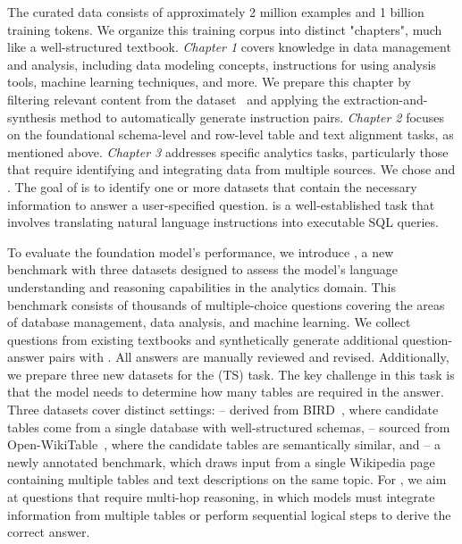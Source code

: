 The curated data consists of approximately 2 million examples and 1 billion training tokens. We organize this training corpus into distinct "chapters", much like a well-structured textbook.
\textit{Chapter 1} covers knowledge in data management and analysis, including data modeling concepts, instructions for using analysis tools, machine learning techniques, and more. We prepare this chapter by filtering relevant content from the \fineweb dataset~\citep{penedo2024fineweb} and applying the extraction-and-synthesis method to automatically generate instruction pairs.
\textit{Chapter 2} focuses on the foundational schema-level and row-level table and text alignment tasks, as mentioned above.
\textit{Chapter 3} addresses specific analytics tasks, particularly those that require identifying and integrating data from multiple sources. We chose \datadiscovery and \texttosql.
The goal of \datadiscovery is to identify one or more datasets that contain the necessary information to answer a user-specified question. \texttosql is a well-established task that involves translating natural language instructions into executable SQL queries. 

To evaluate the foundation model’s performance, we introduce \mmlu, a new benchmark with three datasets designed to assess the model's language understanding and reasoning capabilities in the analytics domain. This benchmark consists of thousands of multiple-choice questions covering the areas of database management, data analysis, and machine learning. We collect questions from existing textbooks and synthetically generate additional question-answer pairs with \claudetf. All answers are manually reviewed and revised. 
Additionally, we prepare three new datasets for the \datadiscovery (TS) task. The key challenge in this task is that the model needs to determine how many tables are required in the answer. Three datasets cover distinct settings:
\birdselect -- derived from BIRD~\citep{bird}, where candidate tables come from a single database with well-structured schemas, 
\openwikiselect -- sourced from Open-WikiTable~\citep{open_wikitable}, where the candidate tables are semantically similar, 
and \wikipage -- a newly annotated benchmark, which draws input from a single Wikipedia page containing multiple tables and text descriptions on the same topic. For \wikipage, we aim at questions that require multi-hop reasoning, in which models must integrate information from multiple tables or perform sequential logical steps to derive the correct answer.




